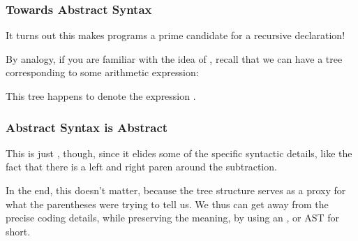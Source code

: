 \documentclass[aspectratio=169]{beamer}
\begin{document}
\begin{frame}[fragile]
  \frametitle{Towards Abstract Syntax}

  It turns out this makes programs a prime candidate for a recursive 
  declaration!

  \pause
  \vspace{\fill}

  By analogy, if you are familiar with the idea of , recall that we can
  have a tree corresponding to some arithmetic expression:

  \begin{center}
  \end{center}

  \pause
  \vspace{\fill}

  This tree happens to denote the expression .
\end{frame}

\begin{frame}[fragile]
  \frametitle{Abstract Syntax is Abstract}

  This is just , though, since it elides some of the
  specific syntactic details, like the fact that there is a left and right paren
  around the subtraction.

  \pause
  \vspace{\fill}

  In the end, this doesn't matter, because the tree structure serves as a
  proxy for what the parentheses were trying to tell us. We thus can get away
  from the precise coding details, while preserving the meaning, by using an
  , or AST for short.
\end{frame}
\end{document}
